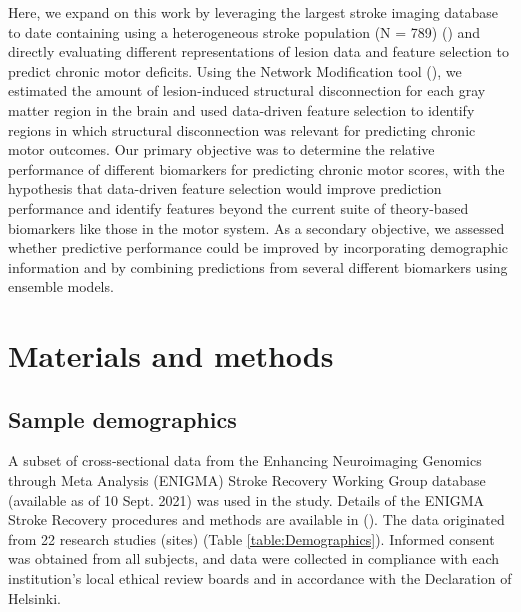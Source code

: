 \documentclass[10pt]{article}
\begin{document}
Here, we expand on this work by leveraging the largest stroke imaging database to date containing using a heterogeneous stroke population (N = 789) (\cite{Liew2020-ps}) and directly evaluating different representations of lesion data and feature selection to predict chronic motor deficits. Using the Network Modification tool (\cite{Kuceyeski2013-nk}), we estimated the amount of lesion-induced structural disconnection for each gray matter region in the brain and used data-driven feature selection to identify regions in which structural disconnection was relevant for predicting chronic motor outcomes. Our primary objective was to determine the relative performance of different biomarkers for predicting chronic motor scores, with the hypothesis that data-driven feature selection would improve prediction performance and identify features beyond the current suite of theory-based biomarkers like those in the motor system. As a secondary objective, we assessed whether predictive performance could be improved by incorporating demographic information and by combining predictions from several different biomarkers using ensemble models.

\section{Materials and methods}
\subsection{Sample demographics}
A subset of cross‐sectional data from the Enhancing Neuroimaging Genomics through Meta Analysis (ENIGMA) Stroke Recovery Working Group database (available as of 10 Sept. 2021) was used in the study. Details of the ENIGMA Stroke Recovery procedures and methods are available in (\cite{Liew2020-ps}). The data originated from 22 research studies (sites) (Table \ref{table:Demographics}). Informed consent was obtained from all subjects, and data were collected in compliance with each institution’s local ethical review boards and in accordance with the Declaration of Helsinki.
\end{document}
